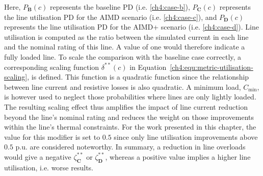 \nomenclature[L]{$C_\text{min}$}{Minimum necessary line loading to take the changes into account, where $C_\text{min} \in [0, 1)$}





Here, $P_\textbf{B}(c)$ represents the baseline PD (i.e. \ref{ch4:case-b}), $P_\textbf{C}(c)$ represents the line utilisation PD for the AIMD scenario (i.e. \ref{ch4:case-c}), and $P_\textbf{D}(c)$ represents the line utilisation PD for the AIMD+ scenario (i.e. \ref{ch4:case-d}).
Line utilisation is computed as the ratio between the simulated current in each line and the nominal rating of this line.
A value of one would therefore indicate a fully loaded line.
To scale the comparison with the baseline case correctly, a corresponding scaling function $\delta^{**}(c)$ in Equation~\ref{ch4:equ:metric-utilisation-scaling}, is defined.
This function is a quadratic function since the relationship between line current and resistive losses is also quadratic.
A minimum load, $C_\text{min}$, is however used to neglect those probabilities where lines are only lightly loaded.
The resulting scaling effect thus amplifies the impact of line current reduction beyond the line's nominal rating and reduces the weight on those improvements within the line's thermal constraints.
For the work presented in this chapter, the value for this modifier is set to $0.5$ since only line utilisation improvements above $0.5$ p.u. are considered noteworthy.
In summary, a reduction in line overloads would give a negative $\zeta^{**}_\textbf{C}$ or $\zeta^{**}_\textbf{D}$, whereas a positive value implies a higher line utilisation, i.e. worse results.

